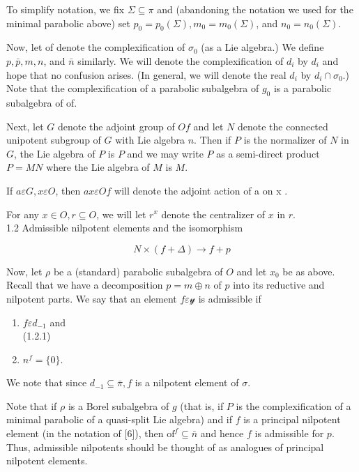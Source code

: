 \documentclass[10pt]{article}
\begin{document}
To simplify notation, we fix $\Sigma \subseteq \pi$ and (abandoning the notation we used for the minimal parabolic above) set $p_{0}=p_{0}(\Sigma), m_{0}=m_{0}(\Sigma)$, and $n_{0}=n_{0}(\Sigma)$.

Now, let of denote the complexification of $\sigma_{0}$ (as a Lie algebra.) We define $p, \bar{p}, m, n$, and $\bar{n}$ similarly. We will denote the complexification of $d_{i}$ by $d_{i}$ and hope that no confusion arises. (In general, we will denote the real $d_{i}$ by $d_{i} \cap \sigma_{0}$.) Note that the complexification of a parabolic subalgebra of $g_{0}$ is a parabolic subalgebra of of.

Next, let $G$ denote the adjoint group of $O f$ and let $N$ denote the connected unipotent subgroup of $G$ with Lie algebra $n$. Then if $P$ is the normalizer of $N$ in $G$, the Lie algebra of $P$ is $P$ and we may write $P$ as a semi-direct product $P=M N$ where the Lie algebra of $M$ is $M$.

If $a \varepsilon G, x \varepsilon O$, then $a x \varepsilon O f$ will denote the adjoint action of a on x .

For any $x \in O, r \subseteq O$, we will let $r^{x}$ denote the centralizer of $x$ in $r$.\\
1.2 Admissible nilpotent elements and the isomorphism

$$
N \times(f+\Delta) \rightarrow f+p
$$

Now, let $\rho$ be a (standard) parabolic subalgebra of $O$ and let $x_{0}$ be as above. Recall that we have a decomposition $p=m \oplus n$ of $p$ into its reductive and nilpotent parts. We say that an element $f \varepsilon \mathcal{y}$ is admissible if

\begin{enumerate}
  \item $f \varepsilon d_{-1}$ and\\
(1.2.1)
  \item $n^{f}=\{0\}$.
\end{enumerate}

We note that since $d_{-1} \subseteq \bar{\pi}, f$ is a nilpotent element of $\sigma$.

Note that if $\rho$ is a Borel subalgebra of $g$ (that is, if $P$ is the complexification of a minimal parabolic of a quasi-split Lie algebra) and if $f$ is a principal nilpotent element (in the notation of [6]), then $\mathrm{of}^{f} \subseteq \bar{n}$ and hence $f$ is admissible for $p$. Thus, admissible nilpotents should be thought of as analogues of principal nilpotent elements.
\end{document}
